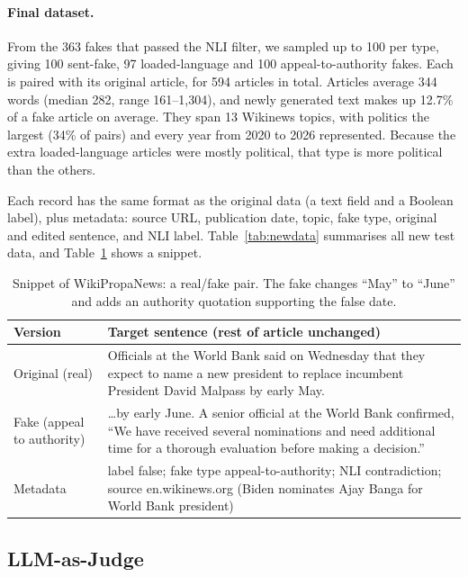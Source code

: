 \documentclass[11pt]{article}
\begin{document}
\paragraph{Final dataset.} From the 363 fakes that passed the NLI filter, we sampled up to 100 per type, giving 100 sent-fake, 97 loaded-language and 100 appeal-to-authority fakes. Each is paired with its original article, for 594 articles in total. Articles average 344 words (median 282, range 161--1,304), and newly generated text makes up 12.7\% of a fake article on average. They span 13 Wikinews topics, with politics the largest (34\% of pairs) and every year from 2020 to 2026 represented. Because the extra loaded-language articles were mostly political, that type is more political than the others.

Each record has the same format as the original data (a text field and a Boolean label), plus metadata: source URL, publication date, topic, fake type, original and edited sentence, and NLI label. Table~\ref{tab:newdata} summarises all new test data, and Table~\ref{tab:wpnexample} shows a snippet.

\begin{table}[t]
\centering\small
\begin{tabular}{@{}>{\raggedright\arraybackslash}p{}>{\raggedright\arraybackslash}p{}@{}}
\toprule
Version & Target sentence (rest of article unchanged) \\
\midrule
Original (real) & Officials at the World Bank said on Wednesday that they expect to name a new president to replace incumbent President David Malpass by early May. \\
\midrule
Fake (appeal to authority) & \ldots by early June. A senior official at the World Bank confirmed, ``We have received several nominations and need additional time for a thorough evaluation before making a decision.'' \\
\midrule
Metadata & label false; fake type appeal-to-authority; NLI contradiction; source en.wikinews.org (Biden nominates Ajay Banga for World Bank president) \\
\bottomrule
\end{tabular}
\caption{Snippet of WikiPropaNews: a real/fake pair. The fake changes ``May'' to ``June'' and adds an authority quotation supporting the false date.}
\label{tab:wpnexample}
\end{table}

\subsection{LLM-as-Judge}
\end{document}
